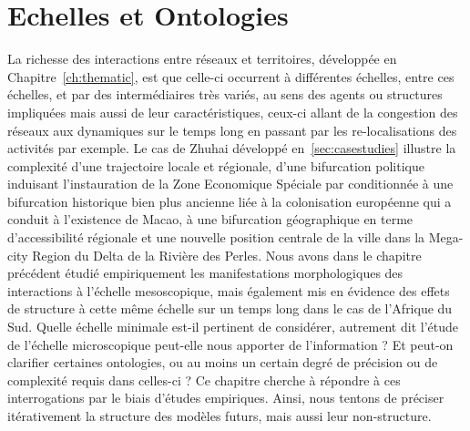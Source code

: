 





\chapter{Echelles et Ontologies}

\label{ch:micro} %





\bigskip



La richesse des interactions entre réseaux et territoires, développée en Chapitre~\ref{ch:thematic}, est que celle-ci occurrent à différentes échelles, entre ces échelles, et par des intermédiaires très variés, au sens des agents ou structures impliquées mais aussi de leur caractéristiques, ceux-ci allant de la congestion des réseaux aux dynamiques sur le temps long en passant par les re-localisations des activités par exemple. Le cas de Zhuhai développé en~\ref{sec:casestudies} illustre la complexité d'une trajectoire locale et régionale, d'une bifurcation politique induisant l'instauration de la Zone Economique Spéciale par  conditionnée à une bifurcation historique bien plus ancienne liée à la colonisation européenne qui a conduit à l'existence de Macao, à une bifurcation géographique en terme d'accessibilité régionale et une nouvelle position centrale de la ville dans la Mega-city Region du Delta de la Rivière des Perles. Nous avons dans le chapitre précédent étudié empiriquement les manifestations morphologiques des interactions à l'échelle mesoscopique, mais également mis en évidence des effets de structure à cette même échelle sur un temps long dans le cas de l'Afrique du Sud. Quelle échelle minimale est-il pertinent de considérer, autrement dit l'étude de l'échelle microscopique peut-elle nous apporter de l'information ? Et peut-on clarifier certaines ontologies, ou au moins un certain degré de précision ou de complexité requis dans celles-ci ? Ce chapitre cherche à répondre à ces interrogations par le biais d'études empiriques. Ainsi, nous tentons de préciser itérativement la structure des modèles futurs, mais aussi leur non-structure.


